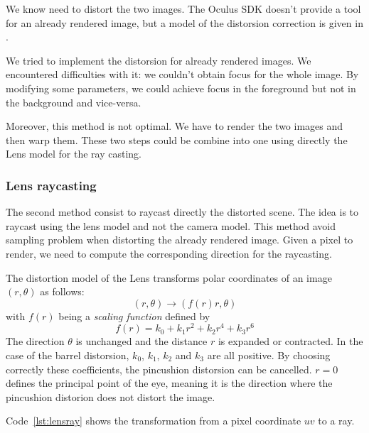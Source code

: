 \documentclass[12pt, twoside]{article}
\begin{document}
We know need to distort the two images. The Oculus SDK doesn't provide a tool for an already rendered image, but a model of the distorsion correction is given in \cite{OVRSDK}.

We tried to implement the distorsion for already rendered images. We encountered difficulties with it: we couldn't obtain focus for the whole image. By modifying some parameters, we could achieve focus in the foreground but not in the background and vice-versa.

Moreover, this method is not optimal. We have to render the two images and then warp them. These two steps could be combine into one using directly the Lens model for the ray casting.

\subsubsection{Lens raycasting}
The second method consist to raycast directly the distorted scene. The idea is to raycast using the lens model and not the camera model. This method avoid sampling problem when distorting the already rendered image. Given a pixel to render, we need to compute the corresponding direction for the raycasting.

The distortion model of the Lens transforms polar coordinates of an image $(r,\theta)$ as follows:
$$(r,\theta)\rightarrow (f(r)r, \theta)$$
with $f(r)$ being a \textit{scaling function} defined by
$$f(r)=k_0+k_1r^2+k_2r^4+k_3r^6$$
The direction $\theta$ is unchanged and the distance $r$ is expanded or contracted. In the case of the barrel distorsion, $k_0$, $k_1$, $k_2$ and $k_3$ are all positive. By choosing correctly these coefficients, the pincushion distorsion can be cancelled. $r = 0$ defines the principal point of the eye, meaning it is the direction where the pincushion distorion does not distort the image.

Code~\ref{lst:lensray} shows the transformation from a pixel coordinate $uv$ to a ray.
\clearpage
\end{document}
